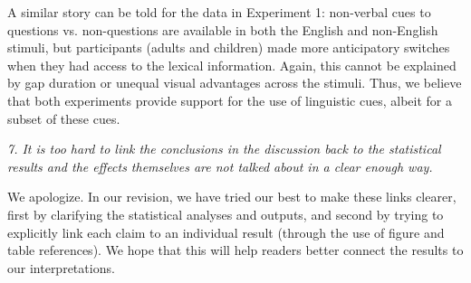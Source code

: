 \documentclass[11pt,a4paper]{letter} %
\begin{document}
\begin{letter}{}
A similar story can be told for the data in Experiment 1: non-verbal cues to questions vs. non-questions are available in both the English and non-English stimuli, but participants (adults and children) made more anticipatory switches when they had access to the lexical information. Again, this cannot be explained by gap duration or unequal visual advantages across the stimuli. Thus, we believe that both experiments provide support for the use of linguistic cues, albeit for a subset of these cues. 



\smallskip

\noindent \textit{7. It is too hard to link the conclusions in the discussion back to the statistical results and the effects themselves are not talked about in a clear enough way.}

\noindent We apologize. In our revision, we have tried our best to make these links clearer, first by clarifying the statistical analyses and outputs, and second by trying to explicitly link each claim to an individual result (through the use of figure and table references). We hope that this will help readers better connect the results to our interpretations.


\end{letter}
\end{document}
